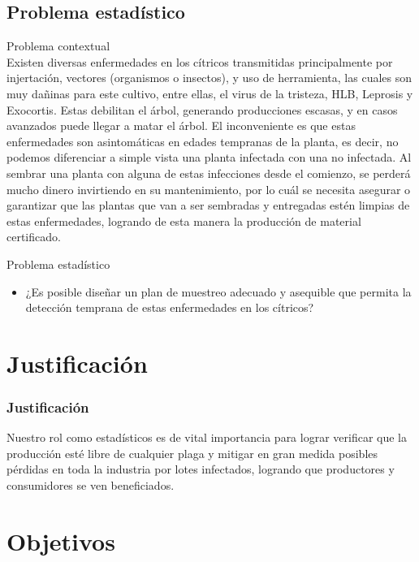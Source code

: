 \documentclass[10pt]{beamer}
\begin{document}
\subsection{Problema estadístico}
\begin{frame}
\begin{block}{Problema contextual}
\justifying
~\\Existen diversas enfermedades en los cítricos transmitidas principalmente por injertación, vectores (organismos o insectos), y uso de herramienta, las cuales son muy dañinas para este cultivo, entre ellas, el virus de la tristeza, HLB, Leprosis y Exocortis. Estas debilitan el árbol, generando producciones escasas, y en casos avanzados puede llegar a matar el árbol. El inconveniente es que estas enfermedades son asintomáticas en edades tempranas de la planta, es decir, no podemos diferenciar a simple vista una planta infectada con una no infectada. Al sembrar una planta con alguna de estas infecciones desde el comienzo, se perderá mucho dinero invirtiendo en su mantenimiento, por lo cuál se necesita asegurar o garantizar que las plantas que van a ser sembradas y entregadas estén limpias de estas enfermedades, logrando de esta manera la producción de material certificado.
\end{block}
\begin{block}{Problema estadístico}
\begin{itemize}
\justifying
\item ¿Es posible diseñar un plan de muestreo adecuado y asequible que permita la detección temprana de estas enfermedades en los cítricos?
\end{itemize}
\end{block}
\end{frame}


\section{Justificación}
\begin{frame}
\frametitle{Justificación}
\justifying
Nuestro rol como estadísticos es de vital importancia para lograr verificar que la producción esté libre de cualquier plaga y mitigar en gran medida posibles pérdidas en toda la industria por lotes infectados, logrando que productores y consumidores se ven beneficiados.
\end{frame}

\section{Objetivos}
\end{document}

